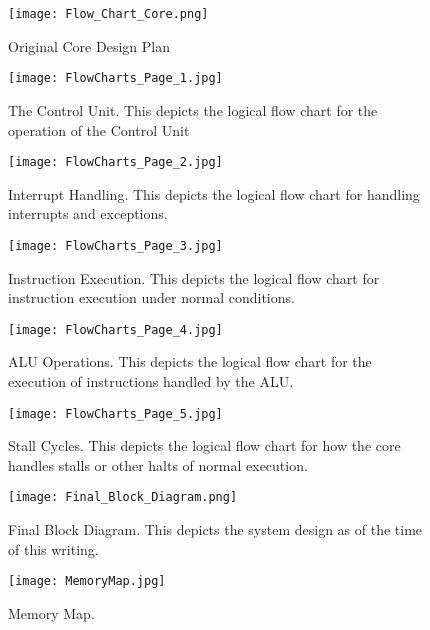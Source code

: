 \documentclass{article}
\begin{document}
\pagebreak
\begin{landscape}
\begin{figure}[H]
\caption{Original Core Design Plan}
\label{flow}
\centering
\texttt{[image: Flow\_Chart\_Core.png]}
\end{figure}

\pagebreak
\begin{figure}[H]
\label{flow1}
\centering
\texttt{[image: FlowCharts\_Page\_1.jpg]}
\caption{The Control Unit.  This depicts the logical flow chart for the operation of the Control Unit}
\end{figure}
\pagebreak

\begin{figure}[H]
\label{flow2}
\centering
\texttt{[image: FlowCharts\_Page\_2.jpg]}
\caption{Interrupt Handling.  This depicts the logical flow chart for handling interrupts and exceptions.}
\end{figure}
\pagebreak

\begin{figure}[H]
\label{flow3}
\centering
\texttt{[image: FlowCharts\_Page\_3.jpg]}
\caption{Instruction Execution.  This depicts the logical flow chart for instruction execution under normal conditions.}
\end{figure}
\end{landscape}

\begin{figure}[H]
\label{flow4}
\centering
\texttt{[image: FlowCharts\_Page\_4.jpg]}
\caption{ALU Operations.  This depicts the logical flow chart for the execution of instructions handled by the ALU.}
\end{figure}

\begin{figure}[H]
\label{flow5}
\centering
\texttt{[image: FlowCharts\_Page\_5.jpg]}
\caption{Stall Cycles.  This depicts the logical flow chart for how the core handles stalls or other halts of normal execution.}
\end{figure}

\begin{landscape}
\begin{figure}[H]
\label{block}
\centering
\texttt{[image: Final\_Block\_Diagram.png]}
\caption{Final Block Diagram.  This depicts the system design as of the time of this writing.}
\end{figure}
\end{landscape}

\begin{figure}[H]
\label{memorymap}
\centering
\texttt{[image: MemoryMap.jpg]}
\caption{Memory Map.}
\end{figure}
\end{document}
